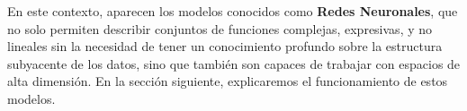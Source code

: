 \documentclass[../../main.tex]{subfiles}
\begin{document}
En este contexto, aparecen los modelos conocidos como \textbf{Redes Neuronales}, que no
solo permiten describir conjuntos de funciones complejas, expresivas, y no lineales sin la
necesidad de tener un conocimiento profundo sobre la estructura subyacente de los datos,
sino que también son capaces de trabajar con espacios de alta dimensión. En la sección
siguiente, explicaremos el funcionamiento de estos modelos.





\end{document}
